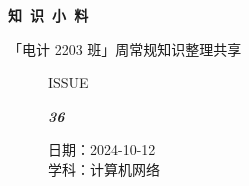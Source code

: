\documentclass[UTF8]{ctexart}
\newcommand\Black[1]{\textcolor[gray]{0.3}{#1}}
\newcommand\Brown[1]{\textcolor[HTML]{998A4E}{#1}}
\newcommand\IssueNumber{36}
\newcommand\Date{2024-10-12}
\newcommand\Subject{计算机网络}
\begin{document}
\BgThispage
\begin{center}
\phantom{...}

{\Large\textcolor{brown!40!white}{}}

\vspace{-2em}

{\Huge\bfseries\TitleFont \Black{知\ 识\ 小\ 料}}


\vspace{-0.1cm}
{\footnotesize \Brown{「电计 2203 班」周常规知识整理共享}}
\end{center}

\vspace{-0.5cm}


\begin{figure}[H]
\hspace{1cm}
\begin{minipage}[t]{0.3\textwidth}
\centering
    \Brown{\Genshin ISSUE}

    \vspace{-0.6cm}
    \Huge \Issue\slshape\bfseries\Black{\IssueNumber}
\end{minipage}
\hfill
\begin{minipage}[t]{0.35\textwidth}
\centering
    \Brown{日期：\Date} \\
\vspace{-0.1cm}
    \Brown{学科：\Subject} \\
\end{minipage}
\hspace{0.8cm}
\end{figure}
\end{document}
